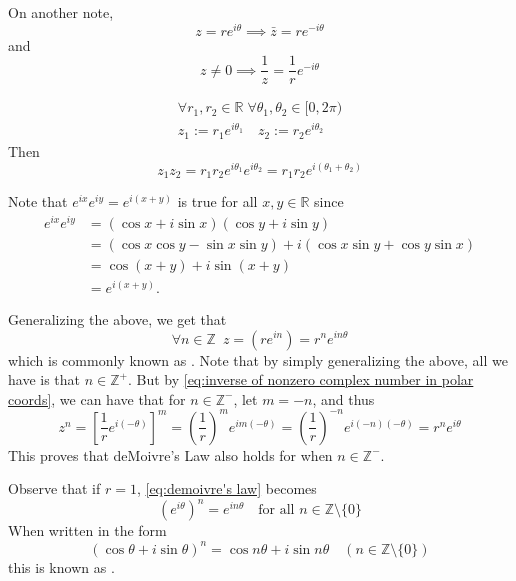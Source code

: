 \documentclass[11pt, oneside]{book}
\begin{document}
On another note,
\begin{equation*}
	z = re^{i \theta} \implies \bar{z} = re^{-i \theta}
\end{equation*}
and
\begin{equation}\label{eq:inverse of nonzero complex number in polar coords}
	z \neq 0 \implies \frac{1}{z} = \frac{1}{r} e^{-i \theta}
\end{equation}

\begin{remark}
	\begin{gather*}
		\forall r_1, r_2 \in \mathbb{R} \; \forall \theta_1, \theta_2 \in [0, 2\pi) \\
		z_1 := r_1 e^{i \theta_1} \quad z_2 := r_2 e^{i \theta_2}
	\end{gather*}
	Then
	\begin{equation*}
		z_1 z_2 = r_1 r_2 e^{i \theta_1} e^{i \theta_2} = r_1 r_2 e^{i (\theta_1 + \theta_2)}
	\end{equation*}

	Note that $e^{ix} e^{iy} = e^{i(x + y)}$ is true for all $x, y \in \mathbb{R} $ since
	\begin{align*}
		e^{ix} e^{iy}
			&= (\cos x + i \sin x)(\cos y + i \sin y) \\
			&= (\cos x \cos y - \sin x \sin y) + i (\cos x \sin y + \cos y \sin x) \\
			&= \cos (x + y) + i \sin (x + y) \\
			&= e^{i (x + y)}.
	\end{align*}

	Generalizing the above, we get that
	\begin{equation}\label{eq:demoivre's law}
		\forall n \in \mathbb{Z} \enspace z = (re^{in}) = r^n e^{in\theta}
	\end{equation}
	which is commonly known as . Note that by simply generalizing the above, all we have is that $n \in \mathbb{Z^+}$. But by \cref{eq:inverse of nonzero complex number in polar coords}, we can have that for $n \in \mathbb{Z^-}$, let $m = -n$, and thus
	\begin{equation*}
		z^n = \left[ \frac{1}{r} e^{i (-\theta)} \right]^m = \left(\frac{1}{r}\right)^m e^{im (-\theta)} = \left(\frac{1}{r} \right)^{-n} e^{i (-n) (-\theta)} = r^n e^{i\theta}
	\end{equation*}
	This proves that deMoivre's Law also holds for when $n \in \mathbb{Z^-}$.

	Observe that if $r = 1$, \cref{eq:demoivre's law} becomes
	\begin{equation}
		(e^{i\theta})^n = e^{in\theta} \quad \text{for all } n \in \mathbb{Z} \setminus \{0\} 
	\end{equation}
	When written in the form
	\begin{equation}\label{eq:demoivre's formula}
		(\cos \theta + i \sin \theta)^n = \cos n\theta + i \sin n\theta \quad (n \in \mathbb{Z} \setminus \{0\})
	\end{equation}
	this is known as .
\end{remark}
\end{document}
